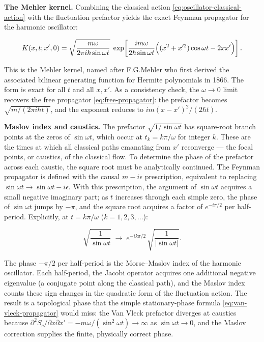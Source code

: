 \medskip\noindent\textbf{The Mehler kernel.}
Combining the classical action \eqref{eq:oscillator-classical-action} with the fluctuation prefactor yields the exact Feynman propagator for the harmonic oscillator:
\begin{linenomath}
\begin{equation}
K(x,t;x',0) = \sqrt{\frac{m\omega}{2\pi i\hbar\sin\omega t}}\;
\exp\!\left[\frac{im\omega}{2\hbar\sin\omega t}\Bigl((x^2 + x'^2)\cos\omega t - 2xx'\Bigr)\right].
\label{eq:mehler-kernel}
\end{equation}
\end{linenomath}
This is the Mehler kernel, named after F.\thinspace G.\thinspace Mehler who first derived the associated bilinear generating function for Hermite polynomials in 1866. The form is exact for all $t$ and all $x, x'$. As a consistency check, the $\omega \to 0$ limit recovers the free propagator \eqref{eq:free-propagator}: the prefactor becomes $\sqrt{m/(2\pi i\hbar t)}$, and the exponent reduces to $im(x-x')^2/(2\hbar t)$.

\medskip\noindent\textbf{Maslov index and caustics.}
The prefactor $\sqrt{1/\sin\omega t}$ has square-root branch points at the zeros of $\sin\omega t$, which occur at $t_k = k\pi/\omega$ for integer $k$. These are the times at which all classical paths emanating from $x'$ reconverge --- the focal points, or caustics, of the classical flow. To determine the phase of the prefactor across each caustic, the square root must be analytically continued. The Feynman propagator is defined with the causal $m - i\epsilon$ prescription, equivalent to replacing $\sin\omega t \to \sin\omega t - i\epsilon$. With this prescription, the argument of $\sin\omega t$ acquires a small negative imaginary part; as $t$ increases through each simple zero, the phase of $\sin\omega t$ jumps by $-\pi$, and the square root acquires a factor of $e^{-i\pi/2}$ per half-period. Explicitly, at $t = k\pi/\omega$ ($k = 1, 2, 3, \dots$):
\begin{linenomath}
\begin{equation}
\sqrt{\frac{1}{\sin\omega t}} \;\longrightarrow\; e^{-i k\pi/2}\,
\sqrt{\frac{1}{|\sin\omega t|}}.
\label{eq:maslov-index}
\end{equation}
\end{linenomath}
The phase $-\pi/2$ per half-period is the Morse--Maslov index of the harmonic oscillator. Each half-period, the Jacobi operator acquires one additional negative eigenvalue (a conjugate point along the classical path), and the Maslov index counts these sign changes in the quadratic form of the fluctuation action. The result is a topological phase that the simple stationary-phase formula \eqref{eq:van-vleck-propagator} would miss: the Van Vleck prefactor diverges at caustics because $\partial^2 S_c/\partial x \partial x' = -m\omega/(\sin^2\omega t) \to \infty$ as $\sin\omega t \to 0$, and the Maslov correction supplies the finite, physically correct phase.

